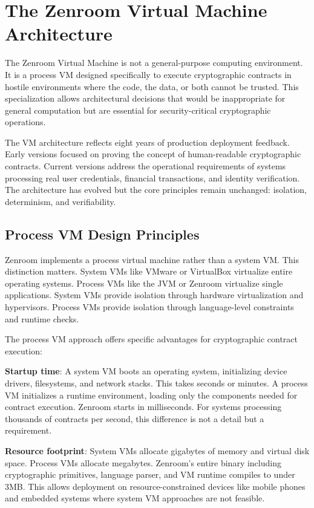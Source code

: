 \section{The Zenroom Virtual Machine Architecture}

The Zenroom Virtual Machine is not a general-purpose computing
environment. It is a process VM designed specifically to execute
cryptographic contracts in hostile environments where the code, the
data, or both cannot be trusted. This specialization allows
architectural decisions that would be inappropriate for general
computation but are essential for security-critical cryptographic
operations.

The VM architecture reflects eight years of production deployment
feedback. Early versions focused on proving the concept of
human-readable cryptographic contracts. Current versions address the
operational requirements of systems processing real user credentials,
financial transactions, and identity verification. The architecture
has evolved but the core principles remain unchanged: isolation,
determinism, and verifiability.

\subsection{Process VM Design Principles}

Zenroom implements a process virtual machine rather than a system
VM. This distinction matters. System VMs like VMware or VirtualBox
virtualize entire operating systems. Process VMs like the JVM or
Zenroom virtualize single applications. System VMs provide isolation
through hardware virtualization and hypervisors. Process VMs provide
isolation through language-level constraints and runtime checks.

The process VM approach offers specific advantages for cryptographic
contract execution:

\textbf{Startup time}: A system VM boots an operating system,
initializing device drivers, filesystems, and network stacks. This
takes seconds or minutes. A process VM initializes a runtime
environment, loading only the components needed for contract
execution. Zenroom starts in milliseconds. For systems processing
thousands of contracts per second, this difference is not a detail but
a requirement.

\textbf{Resource footprint}: System VMs allocate gigabytes of memory
and virtual disk space. Process VMs allocate megabytes. Zenroom's
entire binary including cryptographic primitives, language parser, and
VM runtime compiles to under 3MB. This allows deployment on
resource-constrained devices like mobile phones and embedded systems
where system VM approaches are not feasible.

